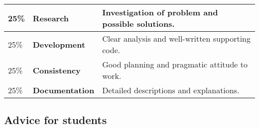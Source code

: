 \documentclass[12pt, a4paper, hidelinks]{scrartcl}
\begin{document}
  \begin{center}
    \begin{tabular}{llp{8.4cm}}
      \toprule
      25\% & \textbf{Research} & Investigation of problem and possible solutions. \\
      \midrule
      25\% & \textbf{Development} & Clear analysis and well-written supporting code. \\
      \midrule
      25\% & \textbf{Consistency} & Good planning and pragmatic attitude to work. \\
      \midrule
      25\% & \textbf{Documentation} & Detailed descriptions and explanations. \\
      \bottomrule
    \end{tabular}
  \end{center}

\subsection*{Advice for students}
\end{document}
